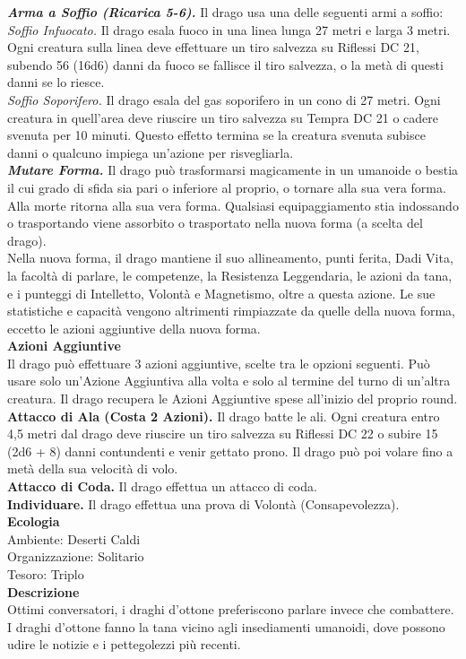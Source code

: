 \begin{multicols}{2}
\emph{\textbf{Arma a Soffio (Ricarica 5-6).}} Il drago usa una delle seguenti armi a soffio:\\
\emph{Soffio Infuocato.} Il drago esala fuoco in una linea lunga 27 metri e larga 3 metri. Ogni creatura sulla linea deve effettuare un tiro salvezza su Riflessi DC 21, subendo 56 (16d6) danni da fuoco se fallisce il tiro salvezza, o la metà di questi danni se lo riesce.\\
\emph{Soffio Soporifero.} Il drago esala del gas soporifero in un cono di 27 metri. Ogni creatura in quell'area deve riuscire un tiro salvezza su Tempra DC 21 o cadere svenuta per 10 minuti. Questo effetto termina se la creatura svenuta subisce danni o qualcuno impiega un'azione per risvegliarla.\\
\emph{\textbf{Mutare Forma.}} Il drago può trasformarsi magicamente in un umanoide o bestia il cui grado di sfida sia pari o inferiore al proprio, o tornare alla sua vera forma. Alla morte ritorna alla sua vera forma. Qualsiasi equipaggiamento stia indossando o trasportando viene assorbito o trasportato nella nuova forma (a scelta del drago). \\
Nella nuova forma, il drago mantiene il suo allineamento, punti ferita, Dadi Vita, la facoltà di parlare, le competenze, la Resistenza Leggendaria, le azioni da tana, e i punteggi di Intelletto, Volontà e Magnetismo, oltre a questa azione. Le sue statistiche e capacità vengono altrimenti rimpiazzate da quelle della nuova forma, eccetto le azioni aggiuntive della nuova forma.\\
\textbf{Azioni Aggiuntive}\\
Il drago può effettuare 3 azioni aggiuntive, scelte tra le opzioni seguenti. Può usare solo un'Azione Aggiuntiva alla volta e solo al termine del turno di un'altra creatura. Il drago recupera le Azioni Aggiuntive spese all'inizio del proprio round.\\
\textbf{Attacco di Ala (Costa 2 Azioni).} Il drago batte le ali. Ogni creatura entro 4,5 metri dal drago deve riuscire un tiro salvezza su Riflessi DC 22 o subire 15 (2d6 + 8) danni contundenti e venir gettato prono. Il drago può poi volare fino a metà della sua velocità di volo.\\
\textbf{Attacco di Coda.} Il drago effettua un attacco di coda.\\
\textbf{Individuare.} Il drago effettua una prova di Volontà (Consapevolezza).\\
\textbf{Ecologia}\\
Ambiente: Deserti Caldi\\
Organizzazione: Solitario\\
Tesoro: Triplo\\
\textbf{Descrizione}\\
Ottimi conversatori, i draghi d’ottone preferiscono parlare invece che combattere. I draghi d’ottone fanno la tana vicino agli insediamenti umanoidi, dove possono udire le notizie e i pettegolezzi più recenti.\\



\end{multicols}
